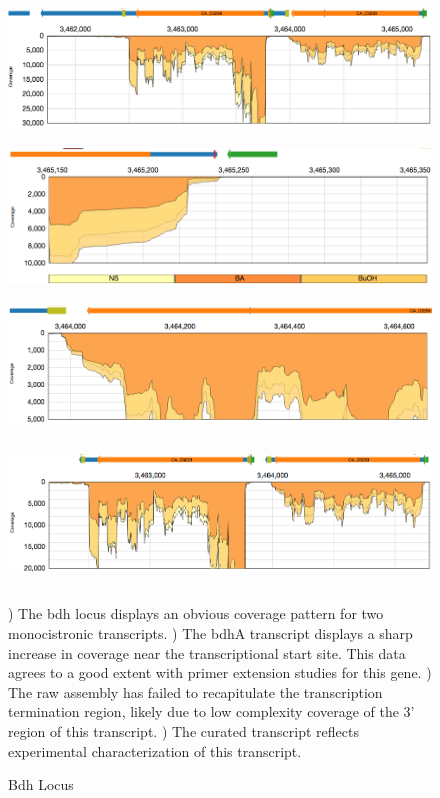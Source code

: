 \begin{figure}
\footnotesize
{\includegraphics[width=\textwidth,height=1.5in]{images/Assembly/Examples/Bdh/Bdh-locus.png}
\label{fig:5.13a}}
{\includegraphics[width=\textwidth,height=1.5in]{images/Assembly/Examples/Bdh/BdhA-TSS.png}
\label{fig:5.13b}}
{\includegraphics[width=\textwidth,height=1.5in]{images/Assembly/Examples/Bdh/BdhA-termination.png}
\label{fig:5.13c}}
{\includegraphics[width=\textwidth,height=1.5in]{images/Assembly/Examples/Bdh/Bdh-curated.png}
\label{fig:5.13d}}
\caption{Bdh Locus}
) The bdh locus displays an obvious coverage pattern for two monocistronic transcripts. ) The bdhA transcript displays a sharp increase in coverage near the transcriptional start site. This data agrees to a good extent with primer extension studies for this gene. ) The raw assembly has failed to recapitulate the transcription termination region, likely due to low complexity coverage of the 3' region of this transcript. ) The curated transcript reflects experimental characterization of this transcript\cite{73}.
\end{figure}

